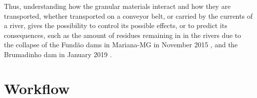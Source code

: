 
    Thus, understanding how the granular materials interact and how they are transported, whether transported on a conveyor belt, or carried by the currents of a river, gives the possibility to control its possible effects, or to predict its consequences, such as the amount of residues remaining in in the rivers due to the collapse of the Fundão dams in Mariana-MG in November 2015 \cite{Mariana_en, Mariana_pt, Mariana_fr}, and the Brumadinho dam in January 2019 \cite{Brumadinho_en, Brumadinho_pt, Brumadinho_fr}.

\section{Workflow}
\label{sec:organizacaoTrabalho}


